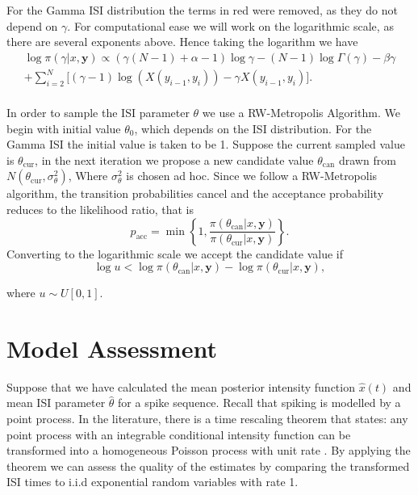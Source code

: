 \documentclass[../main.tex]{subfiles}
\begin{document}
 For the Gamma ISI distribution the terms in red were removed, as they do not depend on $\gamma$. For computational ease we will work on the logarithmic scale, as there are several exponents above. Hence taking the logarithm we have
\begin{gather}
\log \pi (\gamma | x, \mathbf{y}) \propto \left( \gamma \left( N-1 \right) + \alpha-1 \right) \log \gamma - \left( N-1 \right) \log \Gamma \left(  \gamma \right) - \beta \gamma  \nonumber \\ 
 + \sum^N_{i=2} \bigg[ (\gamma - 1) \log (X(y_{i-1}, y_i)) - \gamma X(y_{i-1}, y_i)  \bigg].
\end{gather} \\

In order to sample the ISI parameter $\theta$ we use a RW-Metropolis Algorithm. We begin with initial value $\theta_0$, which depends on the ISI distribution. For the Gamma ISI the initial value is taken to be 1.  Suppose the current sampled value is $\theta_{\mathrm{cur}}$,  in the next iteration we propose a new candidate value $\theta_{\mathrm{can}} $ drawn from $N(\theta_{\mathrm{cur}}, \sigma^2_\theta)$, Where $\sigma^2_\theta$ is chosen ad hoc. Since we follow a RW-Metropolis algorithm, the transition probabilities cancel and the acceptance probability reduces to the likelihood ratio, that is
\begin{equation}
p_{\mathrm{acc}} = \min \left\{ 1, \frac{\pi (\theta_{\mathrm{can}} |x, \mathbf{y})}{\pi (\theta_{\mathrm{cur}} |x, \mathbf{y})} \right\}.
\end{equation}
Converting to the logarithmic scale we accept the candidate value if
\begin{equation}
\log u < \log \pi (\theta_{\mathrm{can}} |x, \mathbf{y}) - \log \pi (\theta_{\mathrm{cur}} |x, \mathbf{y}),
\end{equation}

where $u \sim U[0,1]$.

\section{Model Assessment}
Suppose that we have calculated the mean posterior intensity function $\hat x (t)$ and mean ISI parameter $\hat \theta$ for a spike sequence. Recall that  spiking is modelled by a point process. In the literature, there is a time rescaling theorem that states: any point process with an integrable conditional intensity function can be transformed into a homogeneous Poisson process with unit rate \cite{rescale, PP2}. By applying the theorem we can assess the quality of the estimates by comparing the transformed ISI times to i.i.d exponential random variables with rate 1.
\end{document}
